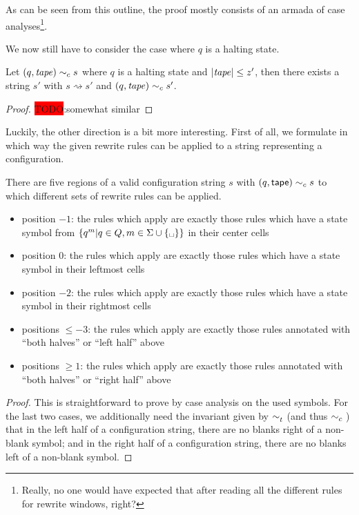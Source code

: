 \documentclass[a4paper,UKenglish,cleveref, autoref]{lipics-v2019}
\newcommand{\TODO}[1]{\colorbox{red}{\LARGE TODO}:#1}
\newcommand{\strent}{\rightsquigarrow}
\begin{document}
As can be seen from this outline, the proof mostly consists of an armada of case analyses\footnote{Really, no one would have expected that after reading all the different rules for rewrite windows, right?}.

We now still have to consider the case where $q$ is a halting state. 
\begin{lemma} 
  Let $(q, \mathit{tape}) \sim_c{} s$ where $q$ is a halting state and $|\mathit{tape}| \le z'$, then there exists a string $s'$ with $s \strent{} s'$ and $(q, \mathit{tape}) \sim_c{} s'$. 
\end{lemma}
\begin{proof}
  \TODO{somewhat similar}
\end{proof}

Luckily, the other direction is a bit more interesting. First of all, we formulate in which way the given rewrite rules can be applied to a string representing a configuration. 

\begin{lemma}
  There are five regions of a valid configuration string $s$ with $(q, \textsf{tape}) \sim_c{} s$ to which different sets of rewrite rules can be applied.
  \begin{itemize}
    \item position $-1$: the rules which apply are exactly those rules which have a state symbol from $\{q^m | q \in Q, m \in \Sigma \cup \{\blank \}\}$ in their center cells
    \item position $0$: the rules which apply are exactly those rules which have a state symbol in their leftmost cells
    \item position $-2$: the rules which apply are exactly those rules which have a state symbol in their rightmost cells
    \item positions $\le -3$: the rules which apply are exactly those rules annotated with  ``both halves'' or ``left half'' above
    \item positions $\ge 1$: the rules which apply are exactly those rules annotated with ``both halves'' or ``right half'' above
  \end{itemize}
\end{lemma}
\begin{proof}
  This is straightforward to prove by case analysis on the used symbols. For the last two cases, we additionally need the invariant given by $\sim_t^{}$ (and thus $\sim_c{}$) that in the left half of a configuration string, there are no blanks right of a non-blank symbol; and in the right half of a configuration string, there are no blanks left of a non-blank symbol.
\end{proof}
\end{document}
